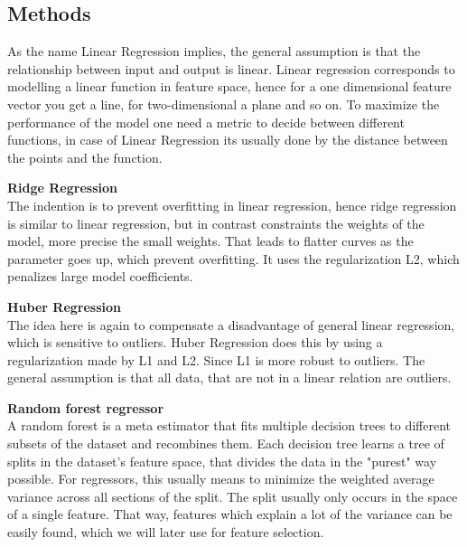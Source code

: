 \documentclass[a4paper,12pt]{article}
\begin{document}
\subsection{Methods}
As the name Linear Regression implies, the general assumption is that the relationship between input and output is linear.
Linear regression corresponds to modelling a linear function in feature space, hence for a one dimensional feature vector you get a line, for two-dimensional a plane and so on. To maximize the performance of the model one need a metric to decide between different functions, in case
of Linear Regression its usually done by the distance between the points and the function.
\begin{description}
\item \textbf{Ridge Regression}\\
The indention is to prevent overfitting in linear regression, hence ridge regression is similar to linear regression, but in contrast constraints the weights of the model, more precise the small weights. That leads to flatter curves as the parameter goes up, which prevent overfitting. It uses the regularization L2, which penalizes large model coefficients.
\item \textbf{Huber Regression}\\
The idea here is again to compensate a disadvantage of general linear regression, which is sensitive to outliers. Huber Regression does this by using a regularization made by L1 and L2. Since L1 is more robust to outliers. The general assumption is that all data, that are not in a linear relation are outliers.
\item \textbf{Random forest regressor}\\
A random forest is a meta estimator that fits multiple decision trees to different subsets of the dataset and recombines them. Each decision tree learns a tree of splits in the dataset's feature space, that divides the data in the "purest" way possible. For regressors, this usually means to minimize the weighted average variance across all sections of the split. The split usually only occurs in the space of a single feature. That way, features which explain a lot of the variance can be easily found, which we will later use for feature selection.
\end{description}
\end{document}
